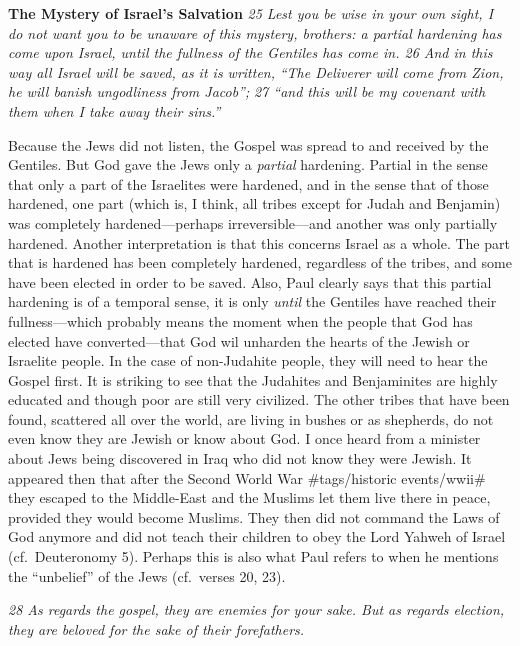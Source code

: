 \textbf{The Mystery of Israel's Salvation} \emph{25 Lest you be wise in
your own sight, I do not want you to be unaware of this mystery,
brothers: a partial hardening has come upon Israel, until the fullness
of the Gentiles has come in. 26 And in this way all Israel will be
saved, as it is written,} \emph{``The Deliverer will come from
Zion,\emph{ }he will banish ungodliness from Jacob'';} \emph{27 ``and
this will be my covenant with them\emph{ }when I take away their
sins.''}

Because the Jews did not listen, the Gospel was spread to and received
by the Gentiles. But God gave the Jews only a \emph{partial} hardening.
Partial in the sense that only a part of the Israelites were hardened,
and in the sense that of those hardened, one part (which is, I think,
all tribes except for Judah and Benjamin) was completely
hardened---perhaps irreversible---and another was only partially
hardened. Another interpretation is that this concerns Israel as a
whole. The part that is hardened has been completely hardened,
regardless of the tribes, and some have been elected in order to be
saved. Also, Paul clearly says that this partial hardening is of a
temporal sense, it is only \emph{until} the Gentiles have reached their
fullness---which probably means the moment when the people that God has
elected have converted---that God wil unharden the hearts of the Jewish
or Israelite people. In the case of non-Judahite people, they will need
to hear the Gospel first. It is striking to see that the Judahites and
Benjaminites are highly educated and though poor are still very
civilized. The other tribes that have been found, scattered all over the
world, are living in bushes or as shepherds, do not even know they are
Jewish or know about God. I once heard from a minister about Jews being
discovered in Iraq who did not know they were Jewish. It appeared then
that after the Second World War \#tags/historic events/wwii\# they
escaped to the Middle-East and the Muslims let them live there in peace,
provided they would become Muslims. They then did not command the Laws
of God anymore and did not teach their children to obey the Lord Yahweh
of Israel (cf.~Deuteronomy 5). Perhaps this is also what Paul refers to
when he mentions the ``unbelief'' of the Jews (cf.~verses 20, 23).

\emph{28 As regards the gospel, they are enemies for your sake. But as
regards election, they are beloved for the sake of their forefathers.}

